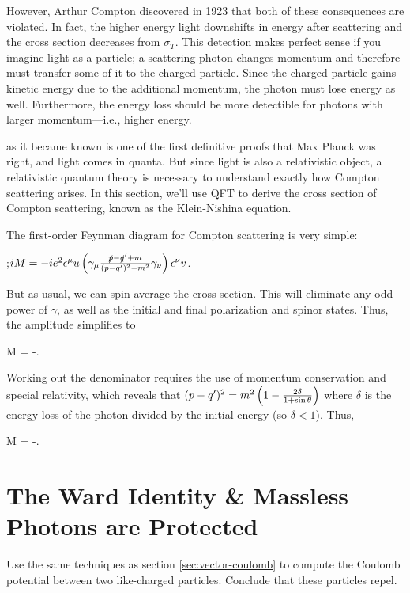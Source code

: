 However, Arthur Compton discovered in 1923 that both of these consequences are violated. In fact, the higher energy light downshifts in energy after scattering and the cross section decreases from $\sigma_T$. This detection makes perfect sense if you imagine light as a particle; a scattering photon changes momentum and therefore must transfer some of it to the charged particle. Since the charged particle gains kinetic energy due to the additional momentum, the photon must lose energy as well. Furthermore, the energy loss should be more detectible for photons with larger momentum---i.e., higher energy.

 as it became known is one of the first definitive proofs that Max Planck was right, and light comes in quanta. But since light is also a relativistic object, a relativistic quantum theory is necessary to understand exactly how Compton scattering arises. In this section, we'll use QFT to derive the cross section of Compton scattering, known as the Klein-Nishina equation.

The first-order Feynman diagram for Compton scattering is very simple:
\begin{center}
  ;\qquad $iM=-ie^2\epsilon^\mu u\left(\gamma_\mu\frac{\slashed p - \slashed q' + m}{(p-q')^2-m^2}\gamma_\nu\right)\epsilon^\nu \overline v$.
\end{center}
But as usual, we can spin-average the cross section. This will eliminate any odd power of $\gamma$, as well as the initial and final polarization and spinor states. Thus, the amplitude simplifies to
\begin{e}
  M = -.
\end{e}
Working out the denominator requires the use of momentum conservation and special relativity, which reveals that $(p-q')^2 = m^2\left(1 - \frac{2\delta}{1+\sin\theta}\right)$ where $\delta$ is the energy loss of the photon divided by the initial energy (so $\delta < 1$). Thus,
\begin{e}
  M = -.
\end{e}




\section{The Ward Identity \& Massless Photons are Protected}

\begin{problem}
  Use the same techniques as section \ref{sec:vector-coulomb} to compute the Coulomb potential between two like-charged particles. Conclude that these particles repel.
\end{problem}